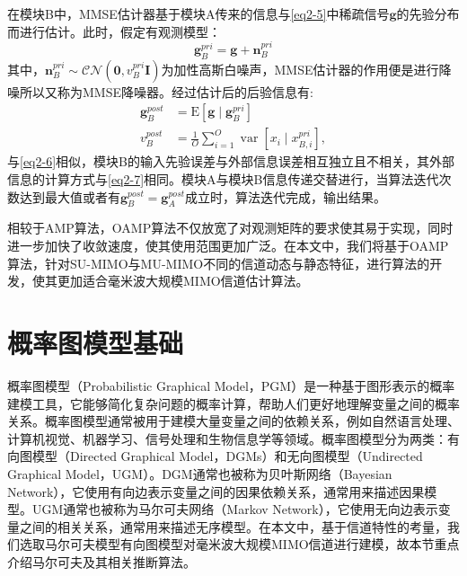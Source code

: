 \documentclass{xdupgthesis}
\begin{document}
在模块B中，MMSE估计器基于模块A传来的信息与\eqref{eq2-5}中稀疏信号$\mathbf{g}$的先验分布而进行估计。此时，假定有观测模型：
\begin{equation}
    \label{eq2-8}
    \mathbf{g}_{B}^{p r i}=\mathbf{g}+\mathbf{n}^{pri}_{B}
\end{equation}
其中，$\mathbf{n}^{pri}_{B}\sim\mathcal{CN}(\mathbf{0},v_{B}^{pri}\mathbf{I})$为加性高斯白噪声，MMSE估计器的作用便是进行降噪所以又称为MMSE降噪器。经过估计后的后验信息有:
\begin{equation}
    \begin{aligned}
        \mathbf{g}_{B}^{p o s t} & =\mathrm{E}\left[\mathbf{g} \mid \mathbf{g}_{B}^{p r i}\right] \\
        v_{B}^{p o s t} & =\frac{1}{O} \sum_{i=1}^{O} \operatorname{var}\left[x_{i} \mid x_{B, i}^{p r i}\right],
    \end{aligned}
\end{equation}
与\eqref{eq2-6}相似，模块B的输入先验误差与外部信息误差相互独立且不相关，其外部信息的计算方式与\eqref{eq2-7}相同。模块A与模块B信息传递交替进行，当算法迭代次数达到最大值或者有$\mathbf{g}_{B}^{p o s t} = \mathbf{g}_{A}^{p o s t}$成立时，算法迭代完成，输出结果。

相较于AMP算法，OAMP算法不仅放宽了对观测矩阵的要求使其易于实现，同时进一步加快了收敛速度\parencite{ma2015performance,ma2017orthogonal}，使其使用范围更加广泛。在本文中，我们将基于OAMP算法，针对SU-MIMO与MU-MIMO不同的信道动态与静态特征，进行算法的开发，使其更加适合毫米波大规模MIMO信道估计算法。

\section{概率图模型基础}
概率图模型（Probabilistic Graphical Model，PGM）是一种基于图形表示的概率建模工具，它能够简化复杂问题的概率计算，帮助人们更好地理解变量之间的概率关系。概率图模型通常被用于建模大量变量之间的依赖关系，例如自然语言处理、计算机视觉、机器学习、信号处理和生物信息学等领域。概率图模型分为两类：有向图模型（Directed Graphical Model，DGMs）和无向图模型（Undirected Graphical Model，UGM）。DGM通常也被称为贝叶斯网络（Bayesian Network），它使用有向边表示变量之间的因果依赖关系，通常用来描述因果模型\parencite{frey2005comparison}。UGM通常也被称为马尔可夫网络（Markov Network），它使用无向边表示变量之间的相关关系，通常用来描述无序模型。在本文中，基于信道特性的考量，我们选取马尔可夫模型有向图模型对毫米波大规模MIMO信道进行建模，故本节重点介绍马尔可夫及其相关推断算法。
\end{document}

